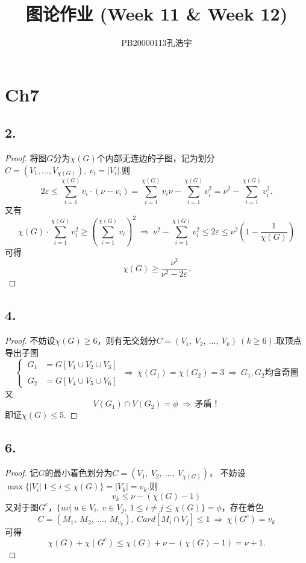 \documentclass{article}
\title{图论作业 (Week 11 \& Week 12)}
\author{PB20000113孔浩宇}
\begin{document}
\maketitle
\section*{Ch7}
\subsection*{2.}
\begin{proof}
    将图$G$分为$\chi (G)$个内部无连边的子图，记为划分$C= (V_1,\ldots,V_{\chi (G)}),\ v_i=|V_i|$.则
    \[
        2\varepsilon 
        \leq \sum\limits_{i=1}^{\chi (G)} v_i \cdot (\nu - v_i)
        =\sum\limits_{i=1}^{\chi (G)} v_i \nu - \sum\limits_{i=1}^{\chi (G)} v_i^2
        =\nu ^2 - \sum\limits_{i=1}^{\chi (G)} v_i^2.
    \]
    又有
    \[
        \chi(G) \cdot \sum\limits_{i=1}^{\chi (G)} v_i^2
        \geq {\left(\sum\limits_{i=1}^{\chi (G)} v_i \right)}^2
        \ \Rightarrow\ 
        \nu ^2 -\sum\limits_{i=1}^{\chi (G)} v_i^2
        \leq 2 \varepsilon \leq \nu ^2 \left(1-\displaystyle{\frac{1}{\chi (G)}}\right)
    \]
    可得
    \[
        \chi (G) \geq \displaystyle{\frac{\nu ^2}{\nu ^2 -2\varepsilon }}.
    \]
\end{proof}

\subsection*{4.}
\begin{proof}
    不妨设$\chi (G)\geq 6$，则有无交划分$C= (V_1 ,\ V_2,\ \ldots ,\ V_k)\ (k\geq 6)$.取顶点导出子图
    \[
        \begin{cases}
            \ G_1&= G[V_1 \cup V_2 \cup V_3]\\
            \\
            \ G_2&= G[V_4 \cup V_5 \cup V_6]
        \end{cases}
        \ \Rightarrow\ 
        \chi(G_1)=\chi(G_2)=3
        \ \Rightarrow\ 
        G_1, G_2\mbox{均含奇圈}
    \]
    又
    \[
        V(G_1) \cap V(G_2) =\phi
        \ \Rightarrow\ 
        \mbox{矛盾！}
    \]
    即证$\chi (G)\leq 5$.
\end{proof}

\subsection*{6.}
\begin{proof}
    记$G$的最小着色划分为$C= (V_1 ,\ V_2,\ \ldots ,\ V_{\chi (G)})$，
    不妨设$\max \{|V_i|\ 1\leq i\leq \chi (G) \} = |V_k|=v_k$.则
    \[
        v_k \leq \nu -(\chi (G)-1)
    \]
    又对于图$G^c$，$\{uv |\ u\in V_i,\ v\in V_j,\ 1\leq i\neq j\leq \chi(G) \}=\phi$，存在着色
    \[
        C={(M_1,\ M_2,\ \ldots,\ M_{v_k})},\ Card [M_i\cap V_j]\leq 1
        \ \Rightarrow\ 
        \chi (G^c) = v_k 
    \]
    可得
    \[
        \chi (G) +\chi (G^c) 
        \leq \chi (G) +\nu -(\chi (G) -1)
        =\nu + 1.
    \]
\end{proof}
\end{document}
